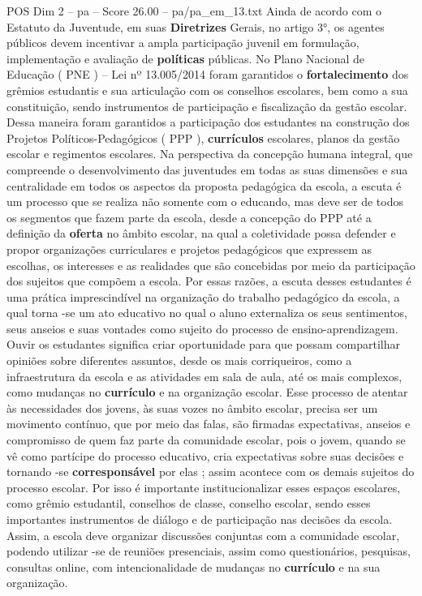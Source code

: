 \begin{textsample}{POS Dim 2 – pa – Score 26.00 – pa/pa\_em\_13.txt}
Ainda de acordo com o Estatuto da Juventude, em suas \textbf{Diretrizes} Gerais, no artigo 3{\EmojiFont °}, os agentes públicos devem incentivar a ampla participação juvenil em formulação, implementação e avaliação de \textbf{políticas} públicas.
No Plano Nacional de Educação ( PNE ) – Lei nº 13.005/2014 foram garantidos o \textbf{fortalecimento} dos grêmios estudantis e sua articulação com os conselhos escolares, bem como a sua constituição, sendo instrumentos de participação e fiscalização da gestão escolar.
Dessa maneira foram garantidos a participação dos estudantes na construção dos Projetos Políticos-Pedagógicos ( PPP ), \textbf{currículos} escolares, planos da gestão escolar e regimentos escolares.
Na perspectiva da concepção humana integral, que compreende o desenvolvimento das juventudes em todas as suas dimensões e sua centralidade em todos os aspectos da proposta pedagógica da escola, a escuta é um processo que se realiza não somente com o educando, mas deve ser de todos os segmentos que fazem parte da escola, desde a concepção do PPP até a definição da \textbf{oferta} no âmbito escolar, na qual a coletividade possa defender e propor organizações curriculares e projetos pedagógicos que expressem as escolhas, os interesses e as realidades que são concebidas por meio da participação dos sujeitos que compõem a escola.
Por essas razões, a escuta desses estudantes é uma prática imprescindível na organização do trabalho pedagógico da escola, a qual torna -se um ato educativo no qual o aluno externaliza os seus sentimentos, seus anseios e suas vontades como sujeito do processo de ensino-aprendizagem.
Ouvir os estudantes significa criar oportunidade para que possam compartilhar opiniões sobre diferentes assuntos, desde os mais corriqueiros, como a infraestrutura da escola e as atividades em sala de aula, até os mais complexos, como mudanças no \textbf{currículo} e na organização escolar.
Esse processo de atentar às necessidades dos jovens, às suas vozes no âmbito escolar, precisa ser um movimento contínuo, que por meio das falas, são firmadas expectativas, anseios e compromisso de quem faz parte da comunidade escolar, pois o jovem, quando se vê como partícipe do processo educativo, cria expectativas sobre suas decisões e tornando -se \textbf{corresponsável} por elas ; assim acontece com os demais sujeitos do processo escolar.
Por isso é importante institucionalizar esses espaços escolares, como grêmio estudantil, conselhos de classe, conselho escolar, sendo esses importantes instrumentos de diálogo e de participação nas decisões da escola.
Assim, a escola deve organizar discussões conjuntas com a comunidade escolar, podendo utilizar -se de reuniões presenciais, assim como questionários, pesquisas, consultas online, com intencionalidade de mudanças no \textbf{currículo} e na sua organização.

\end{textsample}
